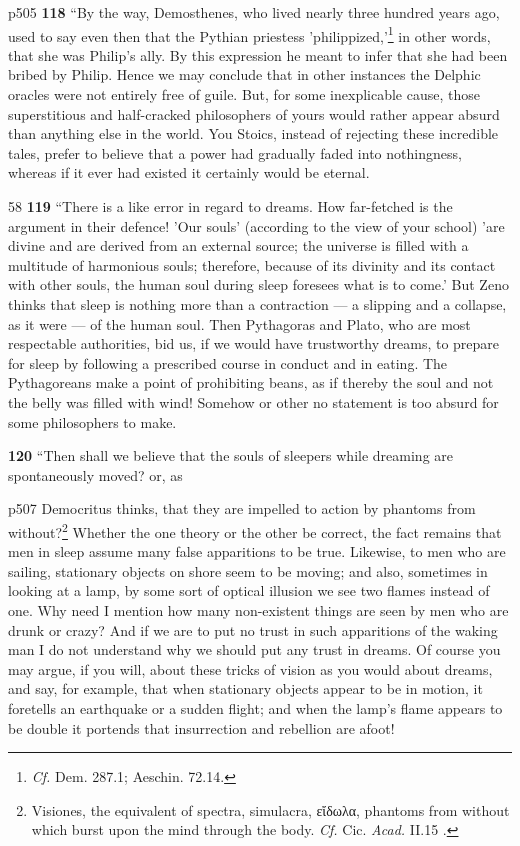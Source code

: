 p505
\textbf{118} ``By the way, Demosthenes, who lived nearly three hundred years ago, used to say even then that the Pythian priestess 'philippized,'\texthebrew{}\footnote{\emph{Cf.} Dem. 287.1; Aeschin. 72.14.

} in other words, that she was Philip's ally. By this expression he meant to infer that she had been bribed by Philip. Hence we may conclude that in other instances the Delphic oracles were not entirely free of guile. But, for some inexplicable cause, those superstitious and half-cracked philosophers of yours would rather appear absurd than anything else in the world. You Stoics, instead of rejecting these incredible tales, prefer to believe that a power had gradually faded into nothingness, whereas if it ever had existed it certainly would be eternal.

58
\textbf{119} ``There is a like error in regard to dreams. How far-fetched is the argument in their defence! 'Our souls' (according to the view of your school) 'are divine and are derived from an external source; the universe is filled with a multitude of harmonious souls; therefore, because of its divinity and its contact with other souls, the human soul during sleep foresees what is to come.' But Zeno thinks that sleep is nothing more than a contraction \texthebrew{—} a slipping and a collapse, as it were \texthebrew{—} of the human soul. Then Pythagoras and Plato, who are most respectable authorities, bid us, if we would have trustworthy dreams, to prepare for sleep by following a prescribed course in conduct and in eating. The Pythagoreans make a point of prohibiting beans, as if thereby the soul and not the belly was filled with wind! Somehow or other no statement is too absurd for some philosophers to make.

\textbf{120} ``Then shall we believe that the souls of sleepers while dreaming are spontaneously moved? or, as

p507 Democritus thinks, that they are impelled to action by phantoms from without?\texthebrew{}\footnote{Visiones, the equivalent of spectra, simulacra, \textgreek{ε\texthebrew{ἴ}δωλα}, phantoms from without which burst upon the mind through the body. \emph{Cf.} Cic. \emph{Acad.} II.15 .

} Whether the one theory or the other be correct, the fact remains that men in sleep assume many false apparitions to be true. Likewise, to men who are sailing, stationary objects on shore seem to be moving; and also, sometimes in looking at a lamp, by some sort of optical illusion we see two flames instead of one. Why need I mention how many non-existent things are seen by men who are drunk or crazy? And if we are to put no trust in such apparitions of the waking man I do not understand why we should put any trust in dreams. Of course you may argue, if you will, about these tricks of vision as you would about dreams, and say, for example, that when stationary objects appear to be in motion, it foretells an earthquake or a sudden flight; and when the lamp's flame appears to be double it portends that insurrection and rebellion are afoot!

